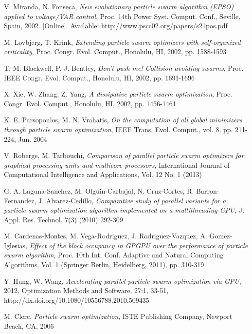 \documentclass[12pt, twoside, openany, abstract=on]{report}
\theoremstyle{definition}
\begin{document}
\begin{thebibliography}{11}
 V. Miranda, N. Fonseca, \emph{New evolutionary particle swarm algorithm (EPSO) applied to voltage/VAR control}, Proc. 14th Power Syst. Comput. Conf., Seville, Spain, 2002. [Online]. Available: http://www.pscc02.org/papers/s21pos.pdf

 M. Lovbjerg, T. Krink, \emph{Extending particle swarm optimizers with self-organized criticality}, Proc. Congr. Evol. Comput., Honolulu, HI, 2002, pp. 1588-1593

 T. M. Blackwell, P. J. Bentley, \emph{Don't push me! Collision-avoiding swarms}, Proc. IEEE Congr. Evol. Comput., Honolulu, HI, 2002, pp. 1691-1696

 X. Xie, W. Zhang, Z. Yang, \emph{A dissipative particle swarm optimization}, Proc. Congr. Evol. Comput., Honolulu, HI, 2002, pp. 1456-1461

 K. E. Parsopoulos, M. N. Vrahatis, \emph{On the computation of all global minimizers through particle swarm optimization}, IEEE Trans. Evol. Comput., vol. 8, pp. 211-224, Jun. 2004


 V. Roberge, M. Tarbouchi, \emph{Comparison of parallel particle swarm optimizers for graphical processing units and multicore processors}, International Journal of Computational Intelligence and Applications, Vol. 12 No. 1 (2013)

 G. A. Laguna-Sanchez, M. Olguin-Carbajal, N. Cruz-Cortes, R. Barron-Fernandez, J. Alvarez-Cedillo, \emph{Comparative study of parallel variants for a particle swarm optimization algorithm implemented on a multithreading GPU}, J. Appl. Res. Technol. 7(3) (2010) 292-309

 M. Cardenas-Montes, M. Vega-Rodriguez, J. Rodriguez-Vazquez, A. Gomez-Iglesias, \emph{Effect of the block occupancy in GPGPU over the performance of particle swarm algorithm}, Proc. 10th Int. Conf. Adaptive and Natural Computing Algorithms, Vol. 1 (Springer Berlin, Heidelberg, 2011), pp. 310-319


 Y. Hung, W. Wang, \emph{Accelerating parallel particle swarm optimization via GPU}, 2012, Optimization Methods and Software, 27:1, 33-51, http://dx.doi.org/10.1080/10556788.2010.509435

 M. Clerc, \emph{Particle swarm optimization}, ISTE Publishing Company, Newport Beach, CA, 2006


\end{thebibliography}
\end{document}
